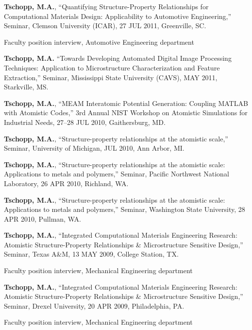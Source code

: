 \begin{cvlist}
\item
\textbf{Tschopp, M.A.}, ``Quantifying Structure-Property Relationships for Computational Materials Design: Applicability to Automotive Engineering,'' Seminar, Clemson University (ICAR), 27 JUL 2011, Greenville, SC.
\begin{list2}
\item[$\star$] Faculty position interview, Automotive Engineering department
\end{list2}

\item
\textbf{Tschopp, M.A.} ``Towards Developing Automated Digital Image Processing Techniques: Application to Microstructure Characterization and Feature Extraction,'' Seminar, Mississippi State University (CAVS), MAY 2011, Starkville, MS.

\item
\textbf{Tschopp, M.A.}, ``MEAM Interatomic Potential Generation: Coupling MATLAB with Atomistic Codes,'' 3rd Annual NIST Workshop on Atomistic Simulations for Industrial Needs, 27--28 JUL 2010, Gaithersburg, MD.

\item
\textbf{Tschopp, M.A.}, ``Structure-property relationships at the atomistic scale,'' Seminar, University of Michigan, JUL 2010, Ann Arbor, MI.

\item
\textbf{Tschopp, M.A.}, ``Structure-property relationships at the atomistic scale: Applications to metals and polymers,'' Seminar, Pacific Northwest National Laboratory, 26 APR 2010, Richland, WA. 

\item
\textbf{Tschopp, M.A.}, ``Structure-property relationships at the atomistic scale: Applications to metals and polymers,'' Seminar, Washington State University, 28 APR 2010, Pullman, WA.

\item
\textbf{Tschopp, M.A.}, ``Integrated Computational Materials Engineering Research: Atomistic Structure-Property Relationships \& Microstructure Sensitive Design,'' Seminar, Texas A\&M, 13 MAY 2009, College Station, TX.
\begin{list2}
\item[$\star$] Faculty position interview, Mechanical Engineering department
\end{list2}

\item
\textbf{Tschopp, M.A.}, ``Integrated Computational Materials Engineering Research: Atomistic Structure-Property Relationships \& Microstructure Sensitive Design,'' Seminar, Drexel University, 20 APR 2009, Philadelphia, PA.
\begin{list2}
\item[$\star$] Faculty position interview, Mechanical Engineering department
\end{list2}


\end{cvlist}
